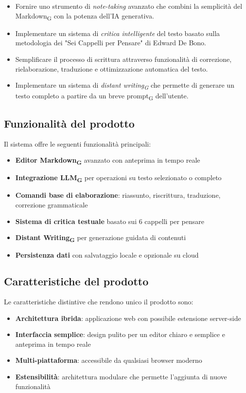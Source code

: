 \documentclass[11pt,a4paper]{article}
\newcommand{\gls}[1]{#1\textsubscript{G}}
\begin{document}
\begin{itemize}
    \item Fornire uno strumento di \textit{note-taking} avanzato che combini la semplicità del \gls{Markdown} con la potenza dell'IA generativa.
    \item Implementare un sistema di \textit{critica intelligente} del testo basato sulla metodologia dei "Sei Cappelli per Pensare" di Edward De Bono.
    \item Semplificare il processo di scrittura attraverso funzionalità di correzione, rielaborazione, traduzione e ottimizzazione automatica del testo.
    \item Implementare un sistema di \textit{\gls{distant writing}} che permette di generare un testo completo a partire da un breve \gls{prompt} dell'utente.
\end{itemize}


\subsection{Funzionalità del prodotto}
Il sistema offre le seguenti funzionalità principali:

\begin{itemize}
    \item \textbf{Editor \gls{Markdown}} avanzato con anteprima in tempo reale
    \item \textbf{Integrazione LLM\textsubscript{G}} per operazioni su testo selezionato o completo
    \item \textbf{Comandi base di elaborazione}: riassunto, riscrittura, traduzione, correzione grammaticale
    \item \textbf{Sistema di critica testuale} basato sui 6 cappelli per pensare
    \item \textbf{\gls{Distant Writing}} per generazione guidata di contenuti
    \item \textbf{Persistenza dati} con salvataggio locale e opzionale su cloud
\end{itemize}

\subsection{Caratteristiche del prodotto}
Le caratteristiche distintive che rendono unico il prodotto sono:

\begin{itemize}
    \item \textbf{Architettura ibrida}: applicazione web con possibile estensione server-side
    \item \textbf{Interfaccia semplice}: design pulito per un editor chiaro e semplice e anteprima in tempo reale
    \item \textbf{Multi-piattaforma}: accessibile da qualsiasi browser moderno
    \item \textbf{Estensibilità}: architettura modulare che permette l'aggiunta di nuove funzionalità
    
\end{itemize}
\end{document}
